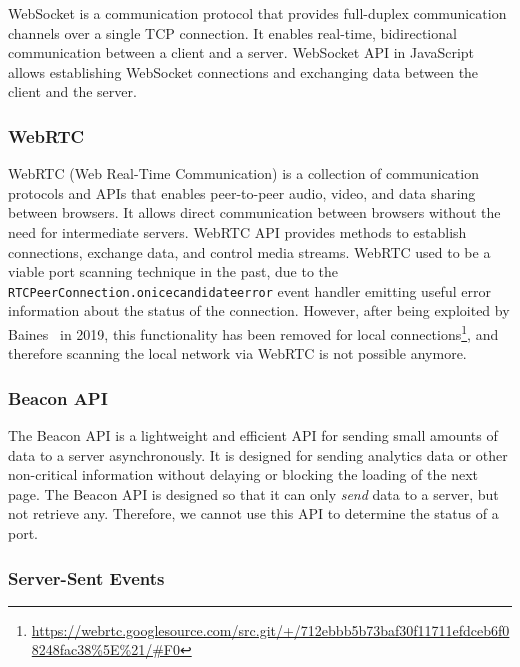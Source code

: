 WebSocket is a communication protocol that provides full-duplex communication channels over a single TCP connection. It enables real-time, bidirectional communication between a client and a server. WebSocket API in JavaScript allows establishing WebSocket connections and exchanging data between the client and the server.


\subsubsection{WebRTC}

WebRTC (Web Real-Time Communication) is a collection of communication protocols and APIs that enables peer-to-peer audio, video, and data sharing between browsers. It allows direct communication between browsers without the need for intermediate servers. WebRTC API provides methods to establish connections, exchange data, and control media streams.
WebRTC used to be a viable port scanning technique in the past, due to the \texttt{RTCPeerConnection.onicecandidateerror} event handler emitting useful error information about the status of the connection. However, after being exploited by Baines~\cite{baines2019} in 2019, 
this functionality has been removed for local connections\footnote{\url{https://webrtc.googlesource.com/src.git/+/712ebbb5b73baf30f11711efdceb6f08248fac38\%5E\%21/\#F0}}, and therefore scanning the local network via WebRTC is not possible anymore.

\subsubsection{Beacon API}

The Beacon API is a lightweight and efficient API for sending small amounts of data to a server asynchronously. It is designed for sending analytics data or other non-critical information without delaying or blocking the loading of the next page. The Beacon API is designed so that it can only \emph{send} data to a server, but not retrieve any. Therefore, we cannot use this API to determine the status of a port.

\subsubsection{Server-Sent Events}

